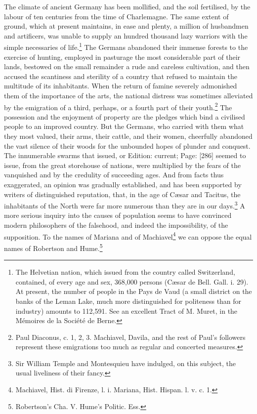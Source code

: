 The climate of ancient Germany has been mollified, and the soil fertilised, by the labour of ten centuries from the time of Charlemagne. The same extent of ground, which at present maintains, in ease and plenty, a million of husbandmen and artificers, was unable to supply an hundred thousand lazy warriors with the simple necessaries of life.\footnote{The Helvetian nation, which issued from the country called Switzerland, contained, of every age and sex, 368,000 persons (Cæsar de Bell. Gall. i. 29). At present, the number of people in the Pays de Vaud (a small district on the banks of the Leman Lake, much more distinguished for politeness than for industry) amounts to 112,591. See an excellent Tract of M. Muret, in the Mémoires de la Société de Berne.} The Germans abandoned their immense forests to the exercise of hunting, employed in pasturage the most considerable part of their lands, bestowed on the small remainder a rude and careless cultivation, and then accused the scantiness and sterility of a country that refused to maintain the multitude of its inhabitants. When the return of famine severely admonished them of the importance of the arts, the national distress was sometimes alleviated by the emigration of a third, perhaps, or a fourth part of their youth.\footnote{Paul Diaconus, c. 1, 2, 3. Machiavel, Davila, and the rest of Paul\texthebrew{}’s followers represent these emigrations too much as regular and concerted measures.} The possession and the enjoyment of property are the pledges which bind a civilised people to an improved country. But the Germans, who carried with them what they most valued, their arms, their cattle, and their women, cheerfully abandoned the vast silence of their woods for the unbounded hopes of plunder and conquest. The innumerable swarms that issued, or Edition: current; Page: [286] seemed to issue, from the great storehouse of nations, were multiplied by the fears of the vanquished and by the credulity of succeeding ages. And from facts thus exaggerated, an opinion was gradually established, and has been supported by writers of distinguished reputation, that, in the age of Cæsar and Tacitus, the inhabitants of the North were far more numerous than they are in our days.\footnote{Sir William Temple and Montesquieu have indulged, on this subject, the usual liveliness of their fancy.} A more serious inquiry into the causes of population seems to have convinced modern philosophers of the falsehood, and indeed the impossibility, of the supposition. To the names of Mariana and of Machiavel\footnote{Machiavel, Hist. di Firenze, l. i. Mariana, Hist. Hispan. l. v. c. 1.} we can oppose the equal names of Robertson and Hume.\footnote{Robertson\texthebrew{}’s Cha. V. Hume\texthebrew{}’s Politic. Ess.}

